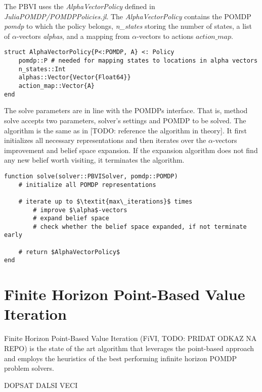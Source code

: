The PBVI uses the \textit{AlphaVectorPolicy} defined in \textit{JuliaPOMDP/POMDPPolicies.jl}. The \textit{AlphaVectorPolicy} contains the POMDP \textit{pomdp} to which the policy belongs, \textit{n\_states} storing the number of states, a list of $\alpha$-vectors \textit{alphas}, and a mapping from $\alpha$-vectors to actions \textit{$action\_map$}.

\begin{samepage}
\begin{verbatim}
struct AlphaVectorPolicy{P<:POMDP, A} <: Policy
    pomdp::P # needed for mapping states to locations in alpha vectors
    n_states::Int
    alphas::Vector{Vector{Float64}}
    action_map::Vector{A}
end
\end{verbatim}
\end{samepage}


The solve parameters are in line with the POMDPs interface. That is, method solve accepts two parameters, solver's settings and POMDP to be solved. The algorithm is the same as in [TODO: reference the algorithm in theory]. It first initializes all necessary representations and then iterates over the $\alpha$-vectors improvement and belief space expansion. If the expansion algorithm does not find any new belief worth visiting, it terminates the algorithm.


\begin{samepage}
\begin{verbatim}
function solve(solver::PBVISolver, pomdp::POMDP)
    # initialize all POMDP representations

    # iterate up to $\textit{max\_iterations}$ times
        # improve $\alpha$-vectors
        # expand belief space
        # check whether the belief space expanded, if not terminate early
    
    # return $AlphaVectorPolicy$
end
\end{verbatim}
\end{samepage}


\section{Finite Horizon Point-Based Value Iteration}
Finite Horizon Point-Based Value Iteration (FiVI, TODO: PRIDAT ODKAZ NA REPO) is the state of the art algorithm that leverages the point-based approach and employs the heuristics of the best performing infinite horizon POMDP problem solvers. 

DOPSAT DALSI VECI






